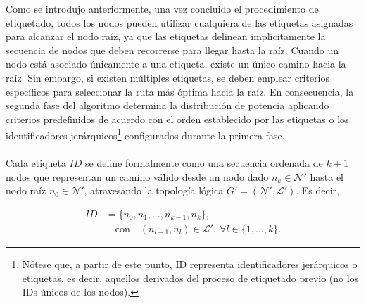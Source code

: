 Como se introdujo anteriormente, una vez concluido el procedimiento de etiquetado, todos los nodos pueden utilizar cualquiera de las etiquetas asignadas para alcanzar el nodo raíz, ya que las etiquetas delinean implícitamente la secuencia de nodos que deben recorrerse para llegar hasta la raíz. Cuando un nodo está asociado únicamente a una etiqueta, existe un único camino hacia la raíz. Sin embargo, si existen múltiples etiquetas, se deben emplear criterios específicos para seleccionar la ruta más óptima hacia la raíz. En consecuencia, la segunda fase del algoritmo determina la distribución de potencia aplicando criterios predefinidos de acuerdo con el orden establecido por las etiquetas o los identificadores jerárquicos\footnote{Nótese que, a partir de este punto, ID representa identificadores jerárquicos o etiquetas, es decir, aquellos derivados del proceso de etiquetado previo (no los IDs únicos de los nodos).} configurados durante la primera fase.\\
\\
Cada etiqueta \( ID \) se define formalmente como una secuencia ordenada de \( k + 1 \) nodos que representan un camino válido desde un nodo dado \( n_k \in \mathcal{N}' \) hasta el nodo raíz \( n_0 \in \mathcal{N}' \), atravesando la topología lógica \( G' = (\mathcal{N}', \mathcal{L}') \). Es decir,

\begin{equation}
\begin{aligned}
    ID &= \{n_0, n_{1}, \dots, n_{k-1}, n_k\}, \\
    &\quad \text{con} \quad (n_{l-1},n_{l}) \in \mathcal{L}', \: \forall l \in \{1, \dots, k\}.
\end{aligned}
\end{equation}
\vspace{0.2cm}

